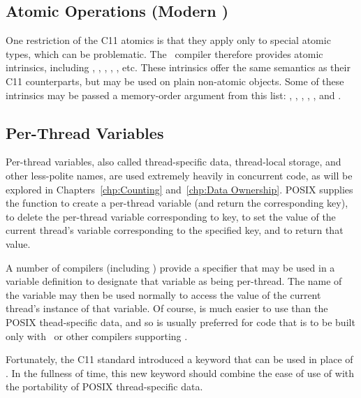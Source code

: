 \subsection{Atomic Operations (Modern \GCC)}
\label{sec:toolsoftrade:Atomic Operations (Modern gcc)}

One restriction of the C11 atomics is that they apply only to special
atomic types, which can be problematic.
The \GNUC\ compiler therefore provides atomic intrinsics, including
,
,
,
,
, etc.
These intrinsics offer the same semantics as their C11 counterparts,
but may be used on plain non-atomic objects.
Some of these intrinsics may be passed a memory-order argument from
this list:
,
,
,
,
, and
.

\subsection{Per-Thread Variables}
\label{sec:toolsoftrade:Per-Thread Variables}

Per-thread variables, also called thread-specific data, thread-local
storage, and other less-polite names, are used extremely
heavily in concurrent code, as will be explored in
Chapters~\ref{chp:Counting} and~\ref{chp:Data Ownership}.
POSIX supplies the  function to create a
per-thread variable (and return the corresponding key),
 to delete the per-thread variable corresponding
to key,
 to set the value of the current thread's
variable corresponding to the specified key,
and  to return that value.

A number of compilers (including \GCC) provide a  specifier
that may be used in a variable definition to designate that variable
as being per-thread.
The name of the variable may then be used normally to access the
value of the current thread's instance of that variable.
Of course,  is much easier to use than the POSIX
thead-specific data, and so  is usually preferred for
code that is to be built only with \GCC\ or other compilers supporting
.

Fortunately, the C11 standard introduced a  keyword
that can be used in place of .
In the fullness of time, this new keyword should combine the ease of use
of  with the portability of POSIX thread-specific data.

